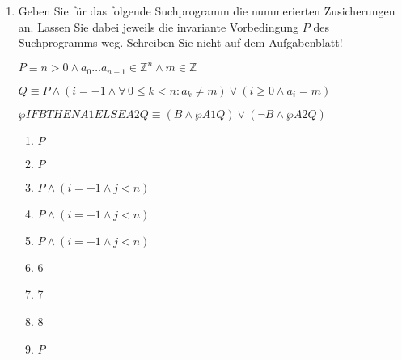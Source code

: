 \documentclass{lehramt-informatik-aufgabe}
\begin{document}
\begin{enumerate}
\begin{liAntwort}
\begin{itemize}
\item Jede Ausführung des Schleifenrumpfs verringert ihren Wert (streng
monoton fallend).

\item Die Schleifenbedingung ist false, wenn $T = 0$.
\end{itemize}

$T$ ist die obere Schranke für die noch ausstehende Anzahl von
Schleifendurchläufen.
\footcite[Seite 33]{sosy:fs:5}

Beweise für Terminierung sind nicht immer möglich!
\footcite[Seite 38]{sosy:fs:5}
\end{liAntwort}


\item Geben Sie für das folgende Suchprogramm die nummerierten
Zusicherungen an. Lassen Sie dabei jeweils die invariante Vorbedingung
$P$ des Suchprogramms weg. Schreiben Sie nicht auf dem Aufgabenblatt!

$P \equiv n > 0 \land a_0 \dots a_{n-1} \in \mathbb{Z}^n \land m \in \mathbb{Z}$



$Q \equiv P \land (i = -1 \land \forall \, 0 \leq k < n \colon a_k \neq m) \lor (i \geq 0 \land a_i = m)$

\begin{liExkurs}
$\wp{IF B THEN A1 ELSE A2}{Q}
\equiv
(B \land \wp{A1}{Q})
\lor
(\neg B \land \wp{A2}{Q})$
\end{liExkurs}

\begin{liAntwort}
{
\renewcommand{\labelenumii}{\arabic{enumii}.}
\begin{enumerate}
\item $P$
\item $P$
\item $P \land (i = -1 \land j < n)$
\item $P \land (i = -1 \land j < n)$
\item $P \land (i = -1 \land j < n)$
\item 6
\item 7
\item 8
\item $P$
\end{enumerate}
}

\end{liAntwort}


\end{enumerate}
\end{document}
